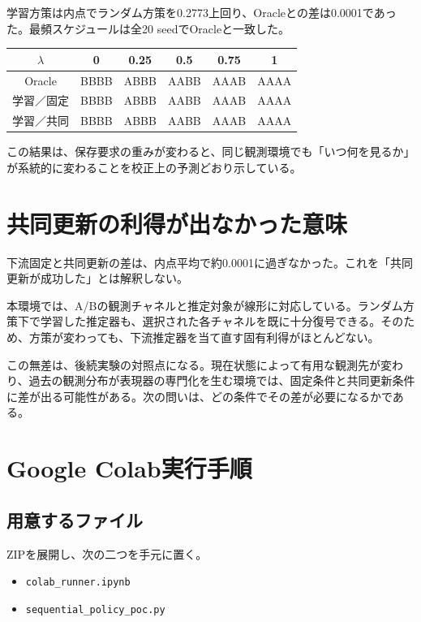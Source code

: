 \documentclass[11pt,a4paper]{ltjsarticle}
\newcommand{\code}[1]{\texttt{#1}}
\begin{document}
学習方策は内点でランダム方策を0.2773上回り、Oracleとの差は0.0001であった。最頻スケジュールは全20 seedでOracleと一致した。

\begin{center}
\begin{tabular}{c|ccccc}
\toprule
$\lambda$ & 0 & 0.25 & 0.5 & 0.75 & 1 \\
\midrule
Oracle & BBBB & ABBB & AABB & AAAB & AAAA \\
学習／固定 & BBBB & ABBB & AABB & AAAB & AAAA \\
学習／共同 & BBBB & ABBB & AABB & AAAB & AAAA \\
\bottomrule
\end{tabular}
\end{center}

この結果は、保存要求の重みが変わると、同じ観測環境でも「いつ何を見るか」が系統的に変わることを校正上の予測どおり示している。

\section{共同更新の利得が出なかった意味}

下流固定と共同更新の差は、内点平均で約0.0001に過ぎなかった。これを「共同更新が成功した」とは解釈しない。

本環境では、A/Bの観測チャネルと推定対象が線形に対応している。ランダム方策下で学習した推定器も、選択された各チャネルを既に十分復号できる。そのため、方策が変わっても、下流推定器を当て直す固有利得がほとんどない。

この無差は、後続実験の対照点になる。現在状態によって有用な観測先が変わり、過去の観測分布が表現器の専門化を生む環境では、固定条件と共同更新条件に差が出る可能性がある。次の問いは、どの条件でその差が必要になるかである。

\section{Google Colab実行手順}

\subsection{用意するファイル}

ZIPを展開し、次の二つを手元に置く。
\begin{itemize}
\item \code{colab\_runner.ipynb}
\item \code{sequential\_policy\_poc.py}
\end{itemize}
\end{document}
